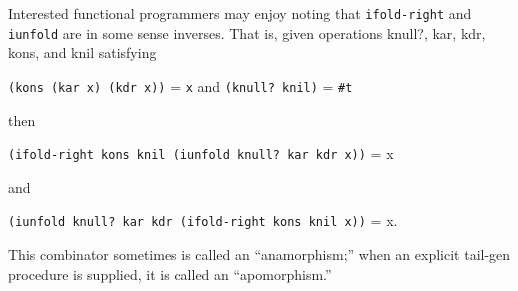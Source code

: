 \begin{entry}{%
  }
Interested functional programmers may enjoy noting that
\texttt{ifold-right} and \texttt{iunfold} are in some sense inverses.
That is, given operations knull?, kar, kdr, kons, and knil satisfying

\texttt{(kons\ (kar\ x)\ (kdr\ x))} = \texttt{x} and \texttt{(knull?\
  knil)} = \texttt{\#t}

then

\texttt{(ifold-right\ kons\ knil\ (iunfold\ knull?\ kar\ kdr\ x))} = x

and

\texttt{(iunfold\ knull?\ kar\ kdr\ (ifold-right\ kons\ knil\ x))} =
x.

This combinator sometimes is called an ``anamorphism;'' when an
explicit tail-gen procedure is supplied, it is called an
``apomorphism.''
\end{entry}

